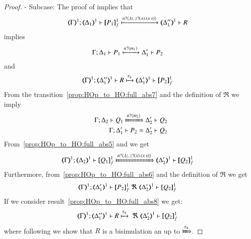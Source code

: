 \begin{proof}
	\noi - Subcase:
	\noi The proof of  implies that
%
	\[
		\horel{\mapt{\Gamma}^{1}}{\mapt{\Delta_1}^{1}}{\pmapp{P_1}{1}{f}}{\hby{\bactinp{n}{\abs{z}{ \binp{z}{x} (\appl{x}{s})}}}}{\mapt{\Delta_1''}^{1}} R %
	\]
%
	\noi implies
%
	\begin{eqnarray}
		\Gamma; \Delta_1 \vdash P_1 \xmapsto{n ?\langle m_1 \rangle} \Delta_1' \vdash P_2
		\label{prop:HOp_to_HO:full_abs7}
	\end{eqnarray}
%
	\noi and
%
	\begin{eqnarray}
		\horel{\mapt{\Gamma}^{1}}{\mapt{\Delta_1''}^{1}}{R}{\hby{\stau}}{\mapt{\Delta_1'}^{1}}{\pmapp{P_2}{1}{f}}
		\label{prop:HOp_to_HO:full_abs8}
	\end{eqnarray}
%
%
	\noi From the transition~\eqref{prop:HOp_to_HO:full_abs7} and the definition of $\Re$ we imply
%
	\begin{eqnarray}
		&&\horel{\Gamma}{\Delta_2}{Q_1}{\Hby{\bactinp{n}{m_2}}}{\Delta_2'}{Q_2}
		\label{prop:HOp_to_HO:full_abs5}
		\\
		&&\horel{\Gamma}{\Delta_1'}{P_2}{\wb}{\Delta_2'}{Q_2}
		\label{prop:HOp_to_HO:full_abs6}
	\end{eqnarray}
%
	\noi From~\eqref{prop:HOp_to_HO:full_abs5} and  we get
%
	\[
		\horel{\mapt{\Gamma}^{1}}{\mapt{\Delta_2}^{1}}{\pmapp{Q_1}{1}{f}}{\Hby{\bactinp{n}{\abs{z}{\binp{z}{x} (\appl{x}{s})}}}}{\mapt{\Delta_2'}^{1}}{\pmapp{Q_2}{1}{f}}
	\]
%
	\noi Furthermore, from~\ref{prop:HOp_to_HO:full_abs6} and the definition of $\Re$ we get
%
	\[
		\horel{\mapt{\Gamma}^{1}}{\mapt{\Delta_1'}^{1}}{\pmapp{P_2}{1}{f}}{\ \Re\ }{\mapt{\Delta_2'}^{1}}{\pmapp{Q_2}{1}{f}}
	\]
%
	\noi If we consider result~\eqref{prop:HOp_to_HO:full_abs8} we get:
%
	\[
		\horel{\mapt{\Gamma}^{1}}{\mapt{\Delta_1''}^{1}}{R}{\hby{\stau}\ \Re\ }{\mapt{\Delta_2'}^{1}}{\pmapp{Q_2}{1}{f}}
	\]
	where following  we show that $R$ is a bisimulation an up to $\Hby{\stau}$.
\end{proof}






